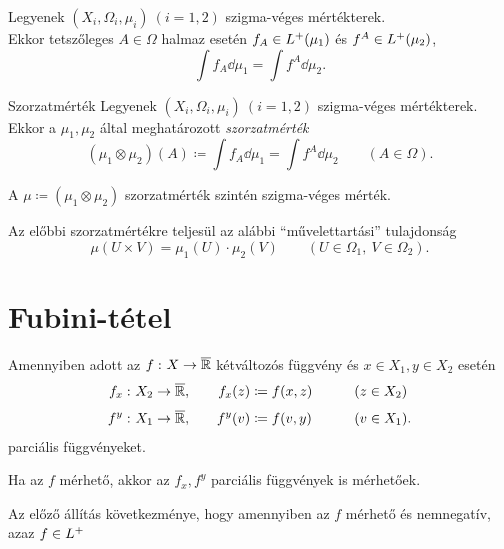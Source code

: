 \documentclass[
]{elteikthesis}[2024/04/26]
\begin{document}
	\begin{statement}{}{}
		Legyenek \( (X_i, \Omega_i, \mu_i) \ (i=1,2) \) szigma-véges mértékterek.\\[6pt]
		Ekkor tetszőleges \( A \in \Omega \) halmaz esetén 
		\( f_A \in L^+(\mu_1) \) és \( f^A \in L^+(\mu_2) \),
		\[
			\int f_A \dd{\mu_1} = 
			\int f^A \dd{\mu_2}.
		\]
	\end{statement}
	
	\begin{definition}{Szorzatmérték}{}
		Legyenek \( (X_i, \Omega_i, \mu_i) \ (i=1,2) \) szigma-véges mértékterek.\\[6pt]
		Ekkor a \( \mu_1, \mu_2 \) által meghatározott \emph{szorzatmérték}
		\[
			(\mu_1 \otimes \mu_2) (A) \coloneq
			\int f_A \dd{\mu_1} = 
			\int f^A \dd{\mu_2}
			\qquad (A \in \Omega).
		\]
	\end{definition}
	
	\begin{notes}
		\item A \( \mu \coloneq (\mu_1 \otimes \mu_2) \) szorzatmérték szintén szigma-véges mérték.
		\item Az előbbi szorzatmértékre teljesül az alábbi ``művelettartási'' tulajdonság
		\[
			\mu(U \times V) = \mu_1(U) \cdot \mu_2(V)
			\qquad (U \in \Omega_1, \ V \in \Omega_2).
		\]
	\end{notes}
	
	\newpage
	\section{Fubini-tétel}
	
	\noindent
	Amennyiben adott az \( f \,\colon X \to \overline{\mathbb{R}} \) kétváltozós függvény 
	és \( x \in X_1, y \in X_2 \) esetén
	\begin{alignat*}{3}
		f_x \,\colon X_2 \to \overline{\mathbb{R}},& \quad 
		&{} f_x(z) &\coloneq f(x, z) \qquad &&(z \in X_2) \\[3pt]
		f^y \,\colon X_1 \to \overline{\mathbb{R}},& \quad 
		&{} f^y(v) &\coloneq f(v, y) \qquad &&(v \in X_1).
	\end{alignat*}
	parciális függvényeket.
	
	\begin{statement}{}{}
		Ha az \( f \) mérhető, akkor az \( f_x, f^y \) parciális függvények is mérhetőek.
	\end{statement}
	
	Az előző állítás következménye, hogy amennyiben az \( f \) mérhető és nemnegatív,
	azaz \( f \in L^+ \)
	
\end{document}
